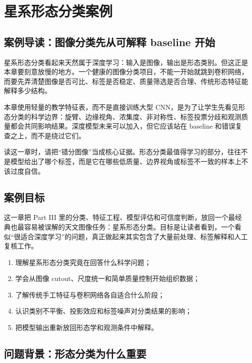 \chapter{星系形态分类案例}

\section{案例导读：图像分类先从可解释 baseline 开始}

星系形态分类看起来天然属于深度学习：输入是图像，输出是形态类别。但这正是本章要刻意放慢的地方。一个健康的图像分类项目，不能一开始就跳到卷积网络，而要先弄清楚图像是否可比、标签是否稳定、质量筛选是否合理、传统形态特征能解释多少结构。

本章使用轻量的教学特征表，而不是直接训练大型 CNN，是为了让学生先看见形态分类的科学边界：旋臂、边缘视角、浓集度、非对称性、标签投票分歧和观测质量都会共同影响结果。深度模型未来可以加入，但它应该站在 baseline 和错误复查之上，而不是绕过它们。

读这一章时，请把“错分图像”当成核心证据。形态分类最值得学习的部分，往往不是模型给出了哪个标签，而是它在哪些低质量、边界视角或标签不一致的样本上不该过度自信。

\section{案例目标}

这一章把 Part III 里的分类、特征工程、模型评估和可信度判断，放回一个最经典也最容易被误解的天文图像任务：星系形态分类。目标是让读者看到，一个看似“很适合深度学习”的问题，真正做起来其实包含了大量前处理、标签解释和人工复核工作。

\begin{enumerate}
    \item 理解星系形态分类究竟在回答什么科学问题；
    \item 学会从图像 cutout、尺度统一和简单质量控制开始组织数据；
    \item 了解传统手工特征与卷积网络各自适合什么阶段；
    \item 认识类别不平衡、投影效应和标签噪声对分类结果的影响；
    \item 把模型输出重新放回形态学和观测条件中解释。
\end{enumerate}

\section{问题背景：形态分类为什么重要}

